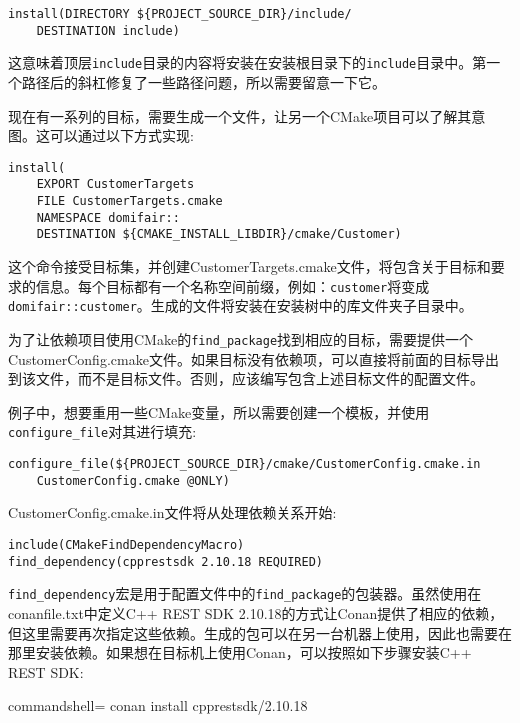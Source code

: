 \begin{lstlisting}[style=styleCMake]
install(DIRECTORY ${PROJECT_SOURCE_DIR}/include/
	DESTINATION include)
\end{lstlisting}

这意味着顶层\texttt{include}目录的内容将安装在安装根目录下的\texttt{include}目录中。第一个路径后的斜杠修复了一些路径问题，所以需要留意一下它。

现在有一系列的目标，需要生成一个文件，让另一个CMake项目可以了解其意图。这可以通过以下方式实现:

\begin{lstlisting}[style=styleCMake]
install(
	EXPORT CustomerTargets
	FILE CustomerTargets.cmake
	NAMESPACE domifair::
	DESTINATION ${CMAKE_INSTALL_LIBDIR}/cmake/Customer)
\end{lstlisting}

这个命令接受目标集，并创建CustomerTargets.cmake文件，将包含关于目标和要求的信息。每个目标都有一个名称空间前缀，例如：\texttt{customer}将变成\texttt{domifair::customer}。生成的文件将安装在安装树中的库文件夹子目录中。

为了让依赖项目使用CMake的\texttt{find\_package}找到相应的目标，需要提供一个CustomerConfig.cmake文件。如果目标没有依赖项，可以直接将前面的目标导出到该文件，而不是目标文件。否则，应该编写包含上述目标文件的配置文件。

例子中，想要重用一些CMake变量，所以需要创建一个模板，并使用\texttt{configure\_file}对其进行填充:

\begin{lstlisting}[style=styleCMake]
configure_file(${PROJECT_SOURCE_DIR}/cmake/CustomerConfig.cmake.in
	CustomerConfig.cmake @ONLY)
\end{lstlisting}

CustomerConfig.cmake.in文件将从处理依赖关系开始:

\begin{lstlisting}[style=styleCMake]
include(CMakeFindDependencyMacro)
find_dependency(cpprestsdk 2.10.18 REQUIRED)
\end{lstlisting}

\texttt{find\_dependency}宏是用于配置文件中的\texttt{find\_package}的包装器。虽然使用在conanfile.txt中定义C++ REST SDK 2.10.18的方式让Conan提供了相应的依赖，但这里需要再次指定这些依赖。生成的包可以在另一台机器上使用，因此也需要在那里安装依赖。如果想在目标机上使用Conan，可以按照如下步骤安装C++ REST SDK:

\begin{tcblisting}{commandshell={}}
conan install cpprestsdk/2.10.18
\end{tcblisting}

